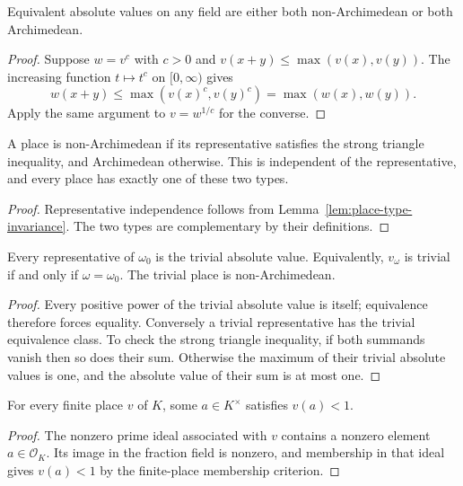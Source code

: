 \begin{lemma}\label{lem:place-type-invariance}
\leanok
{}
Equivalent absolute values on any field are either both non-Archimedean
or both Archimedean.
\end{lemma}
\begin{proof}
Suppose $w=v^c$ with $c>0$ and $v(x+y)\leq\max(v(x),v(y))$.
The increasing function $t\mapsto t^c$ on $[0,\infty)$ gives
\[
 w(x+y)\leq\max(v(x)^c,v(y)^c)=\max(w(x),w(y)).
\]
Apply the same argument to $v=w^{1/c}$ for the converse.
\end{proof}

\begin{definition}\label{def:place-types}
\leanok
{}
A place is non-Archimedean if its representative satisfies the strong
triangle inequality, and Archimedean otherwise. This is independent of
the representative, and every place has exactly one of these two types.
\end{definition}
\begin{proof}
Representative independence follows from
Lemma~\ref{lem:place-type-invariance}. The two types are complementary
by their definitions.
\end{proof}

\begin{lemma}\label{lem:trivial-place}
\leanok
{}
Every representative of $\omega_0$ is the trivial absolute value.
Equivalently, $v_\omega$ is trivial if and only if $\omega=\omega_0$.
The trivial place is non-Archimedean.
\end{lemma}
\begin{proof}
Every positive power of the trivial absolute value is itself; equivalence
therefore forces equality. Conversely a trivial representative has the
trivial equivalence class. To check the strong triangle inequality, if
both summands vanish then so does their sum. Otherwise the maximum of
their trivial absolute values is one, and the absolute value of their sum
is at most one.
\end{proof}

\begin{lemma}\label{lem:finite-place-small-element}
\leanok
{}
For every finite place $v$ of $K$, some $a\in K^\times$ satisfies $v(a)<1$.
\end{lemma}
\begin{proof}
The nonzero prime ideal associated with $v$ contains a nonzero element
$a\in\mathcal O_K$. Its image in the fraction field is nonzero, and
membership in that ideal gives $v(a)<1$ by the finite-place membership
criterion.
\end{proof}

